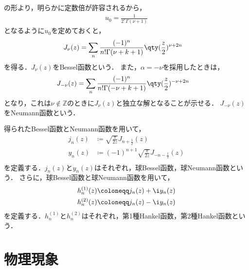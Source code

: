 \documentclass{report}
\begin{document}
      の形より，明らかに定数倍が許容されるから，
      \begin{align}
        u_0 = \frac{1}{2^{\nu}\Gamma(\nu + 1)}
      \end{align}
      となるように$u_0$を定めておくと，
      \begin{align}
        J_{\nu}(z) &= \sum_{n}\frac{(-1)^n}{n!\Gamma(\nu + k + 1)}\qty(\frac{z}{2})^{\nu + 2n}
      \end{align}
      を得る．$J_{\nu}(z)$をBessel函数という．
      また，$\alpha = -\nu$を採用したときは，
      \begin{align}
        J_{-\nu}(z) &= \sum_{n}\frac{(-1)^n}{n!\Gamma(-\nu + k + 1)}\qty(\frac{z}{2})^{-\nu + 2n}
      \end{align}
      となり，これは$\nu \notin \mathbb{Z}$のときに$J_{\nu}(z)$と独立な解となることが示せる．
      $J_{-\nu}(z)$をNeumann函数という．
      \par
      得られたBessel函数とNeumann函数を用いて，
      \begin{align}
        j_n(z) &\coloneqq \sqrt{\frac{\pi}{2z}}J_{n + \frac{1}{2}}(z) \\ 
        y_n(z) &\coloneqq (-1)^{n + 1}\sqrt{\frac{\pi}{2z}}J_{-n-\frac{1}{2}}(z) \\ 
      \end{align}
      を定義する．$j_n(z)$と$y_n(z)$はそれぞれ，球Bessel函数，球Neumann函数という．
      さらに，球Bessel函数と球Neumann函数を用いて，
      \begin{align}
        h_n^{(1)}(z) &\coloneqq j_n(z) + \i y_n(z) \\ 
        h_n^{(2)}(z) &\coloneqq j_n(z) - \i y_n(z)
      \end{align}
      を定義する．$h_n^{(1)}$と$h_n^{(2)}$はそれぞれ，第1種Hankel函数，第2種Hankel函数という．
  \chapter{物理現象}
\end{document}
